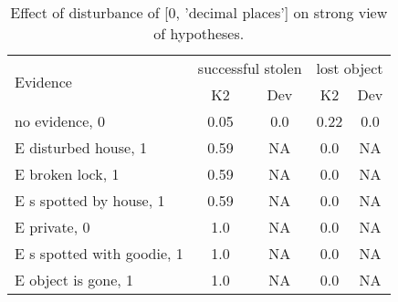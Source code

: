 \begin{table}\begin{tabular}{l|cc|cc}\toprule\multirow{2}{*}{Evidence} & \multicolumn{2}{c}{successful stolen}& \multicolumn{2}{c}{lost object}\\& {K2} & {Dev}& {K2} & {Dev}\\\midrule
no evidence, 0 & \cellcolor{Bittersweet}0.05&\cellcolor{Bittersweet}0.0&\cellcolor{Bittersweet}0.22&\cellcolor{Bittersweet}0.0\\E disturbed house, 1 & \cellcolor{Bittersweet}0.59&\cellcolor{Bittersweet}NA&\cellcolor{Bittersweet}0.0&\cellcolor{Bittersweet}NA\\E broken lock, 1 & \cellcolor{Bittersweet}0.59&\cellcolor{Bittersweet}NA&\cellcolor{Bittersweet}0.0&\cellcolor{Bittersweet}NA\\E s spotted by house, 1 & \cellcolor{Bittersweet}0.59&\cellcolor{Bittersweet}NA&\cellcolor{Bittersweet}0.0&\cellcolor{Bittersweet}NA\\E private, 0 & \cellcolor{Bittersweet}1.0&\cellcolor{Bittersweet}NA&\cellcolor{Bittersweet}0.0&\cellcolor{Bittersweet}NA\\E s spotted with goodie, 1 & \cellcolor{Bittersweet}1.0&\cellcolor{Bittersweet}NA&\cellcolor{Bittersweet}0.0&\cellcolor{Bittersweet}NA\\E object is gone, 1 & \cellcolor{Bittersweet}1.0&\cellcolor{Bittersweet}NA&\cellcolor{Bittersweet}0.0&\cellcolor{Bittersweet}NA\\\bottomrule\end{tabular}\caption{Effect of disturbance of [0, 'decimal places'] on strong view of hypotheses.}\end{table}